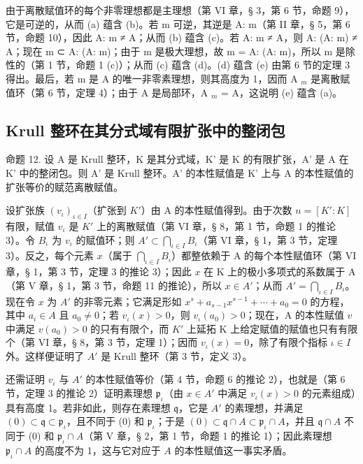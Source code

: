 由于离散赋值环的每个非零理想都是主理想（第 VI 章，§ 3，第 6 节，命题 9），它是可逆的，从而 (a) 蕴含 (b)。若 m 可逆，其逆是 A: m（第 II 章，§ 5，第 6 节，命题 10），因此 A: m ≠ A；从而 (b) 蕴含 (c)。若 A: m ≠ A，则 A: (A: m) ≠ A；现在 m ⊂ A: (A: m)；由于 m 是极大理想，故 m = A: (A: m)，所以 m 是除性的（第 1 节，命题 1 (c)）；从而 (c) 蕴含 (d)。(d) 蕴含 (e) 由第 6 节的定理 3 得出。最后，若 m 是 A 的唯一非零素理想，则其高度为 1，因而 A \(_{m}\) 是离散赋值环（第 6 节，定理 4）；由于 A 是局部环，A \(_{m}\) = A，这说明 (e) 蕴含 (a)。

\subsection{Krull 整环在其分式域有限扩张中的整闭包}

命题 12. 设 A 是 Krull 整环，K 是其分式域，K' 是 K 的有限扩张，A' 是 A 在 K' 中的整闭包。则 A' 是 Krull 整环。A' 的本性赋值是 K' 上与 A 的本性赋值的扩张等价的赋范离散赋值。

设扩张族 \((v_{\iota})_{\iota\in I}\)（扩张到 \(K'\)）由 A 的本性赋值得到。由于次数 \(n = [K':K]\) 有限，赋值 \(v_{\iota}\) 是 \(K'\) 上的离散赋值（第 VI 章，§ 8，第 1 节，命题 1 的推论 3）。令 \(B_{\iota}\) 为 \(v_{\iota}\) 的赋值环；则 \(A' \subset \bigcap_{\iota\in I}B_{\iota}\)（第 VI 章，§ 1，第 3 节，定理 3）。反之，每个元素 \(x\)（属于 \(\bigcap_{\iota\in I}B_{\iota}\)）都整依赖于 A 的每个本性赋值环（第 VI 章，§ 1，第 3 节，定理 3 的推论 3）；因此 \(x\) 在 K 上的极小多项式的系数属于 A（第 V 章，§ 1，第 3 节，命题 11 的推论），所以 \(x\in A'\)；从而 \(A' = \bigcap_{\iota\in I}B_{\iota}\)。现在令 \(x\) 为 \(A'\) 的非零元素；它满足形如 \(x^{s} + a_{s-1}x^{s-1} + \cdots + a_{0} = 0\) 的方程，其中 \(a_{i}\in A\) 且 \(a_{0}\neq 0\)；若 \(v_{\iota}(x) > 0\)，则 \(v_{\iota}(a_{0}) > 0\)；现在，A 的本性赋值 \(v\) 中满足 \(v(a_{0}) > 0\) 的只有有限个，而 \(K'\) 上延拓 K 上给定赋值的赋值也只有有限个（第 VI 章，§ 8，第 3 节，定理 1）；因而 \(v_{\iota}(x) = 0\)，除了有限个指标 \(\iota\in I\) 外。这样便证明了 \(A'\) 是 Krull 整环（第 3 节，定义 3）。

还需证明 \(v_{\iota}\) 与 \(A'\) 的本性赋值等价（第 4 节，命题 6 的推论 2），也就是（第 6 节，定理 3 的推论 2）证明素理想 \(\mathfrak{p}_{\iota}\)（由 \(x \in A'\) 中满足 \(v_{\iota}(x) > 0\) 的元素组成）具有高度 1。若非如此，则存在素理想 \(\mathfrak{q}\)，它是 \(A'\) 的素理想，并满足 \((0) \subset \mathfrak{q} \subset \mathfrak{p}_{\iota}\)，且不同于 (0) 和 \(\mathfrak{p}_{\iota}\)；于是 \((0) \subset \mathfrak{q} \cap A \subset \mathfrak{p}_{\iota} \cap A\)，并且 \(\mathfrak{q} \cap A\) 不同于 (0) 和 \(\mathfrak{p}_{\iota} \cap A\)（第 V 章，§ 2，第 1 节，命题 1 的推论 1）；因此素理想 \(\mathfrak{p}_{\iota} \cap A\) 的高度不为 1，这与它对应于 \(A\) 的本性赋值这一事实矛盾。

